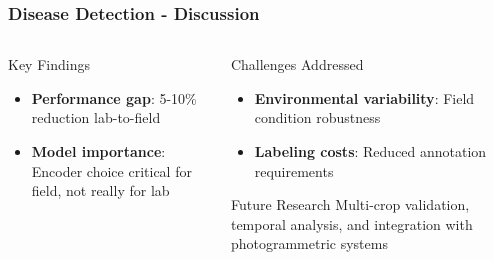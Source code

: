 \documentclass[aspectratio=43]{beamer}
\begin{document}
\begin{frame}
    \frametitle{\small Disease Detection - Discussion}
    
    \begin{columns}
        \begin{column}{0.5\textwidth}
            \begin{block}{Key Findings}
                \begin{itemize}
                    \item \textbf{Performance gap}: 5-10\% reduction lab-to-field
                    \item \textbf{Model importance}: Encoder choice critical for field, not really for lab
                \end{itemize}
            \end{block}
        \end{column}
        
        \begin{column}{0.5\textwidth}
            \begin{alertblock}{Challenges Addressed}
                \begin{itemize}
                    \item \textbf{Environmental variability}: Field condition robustness
                    \item \textbf{Labeling costs}: Reduced annotation requirements
                \end{itemize}
            \end{alertblock}
            
            \begin{exampleblock}{Future Research}
                Multi-crop validation, temporal analysis, and integration with photogrammetric systems
            \end{exampleblock}
        \end{column}
    \end{columns}
\end{frame}
\end{document}
